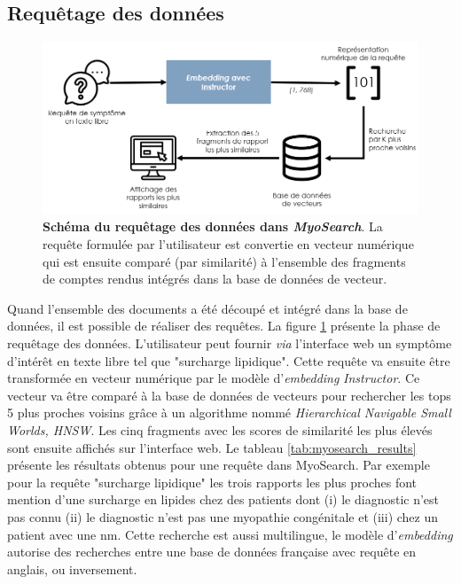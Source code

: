 \subsection{Requêtage des données}
\begin{figure}[!htbp]
 \centering
 \includegraphics[width=1\textwidth]{figures/myosearch_query.png}
 \caption[Requêtage des données dans \textit{MyoSearch}]{\textbf{Schéma du requêtage des données dans \textit{MyoSearch}}. La requête formulée par l'utilisateur est convertie en vecteur numérique qui est ensuite comparé (par similarité) à l'ensemble des fragments de comptes rendus intégrés dans la base de données de vecteur.}
 \label{fig:myosearch_query}
\end{figure}
Quand l'ensemble des documents a été découpé et intégré dans la base de données, il est possible de réaliser des requêtes. La figure \ref{fig:myosearch_query} présente la phase de requêtage des données. L'utilisateur peut fournir \textit{via} l'interface web un symptôme d'intérêt en texte libre tel que "surcharge lipidique". Cette requête va ensuite être transformée en vecteur numérique par le modèle d'\textit{embedding }\textit{Instructor}. Ce vecteur va être comparé à la base de données de vecteurs pour rechercher les tops 5 plus proches voisins grâce à un algorithme nommé \textit{Hierarchical Navigable Small Worlds, HNSW}. Les cinq fragments avec les scores de similarité les plus élevés sont ensuite affichés sur l'interface web. Le tableau \ref{tab:myosearch_results} présente les résultats obtenus pour une requête dans MyoSearch. Par exemple pour la requête "surcharge lipidique" les trois rapports les plus proches font mention d'une surcharge en lipides chez des patients dont (i) le diagnostic n'est pas connu (ii) le diagnostic n'est pas une myopathie congénitale et (iii) chez un patient avec une \gls{nm}. Cette recherche est aussi multilingue, le modèle d'\textit{embedding} autorise des recherches entre une base de données française avec requête en anglais, ou inversement.
